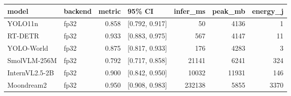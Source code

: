\begin{tabular}{llrlrrr}
\toprule
model & backend & metric & 95\% CI & infer\_ms & peak\_mb & energy\_j \\
\midrule
YOLO11n & fp32 & 0.858 & [0.792, 0.917] & 50 & 4136 & 1 \\
RT-DETR & fp32 & 0.933 & [0.883, 0.975] & 567 & 4147 & 11 \\
YOLO-World & fp32 & 0.875 & [0.817, 0.933] & 176 & 4283 & 3 \\
SmolVLM-256M & fp32 & 0.792 & [0.717, 0.858] & 21141 & 6241 & 324 \\
InternVL2.5-2B & fp32 & 0.900 & [0.842, 0.950] & 10032 & 11931 & 146 \\
Moondream2 & fp32 & 0.950 & [0.908, 0.983] & 232138 & 5855 & 3370 \\
\bottomrule
\end{tabular}